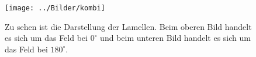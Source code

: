 \begin{figure}[htpb]
	\centering
	\texttt{[image: ../Bilder/kombi]}
	\caption{Zu sehen ist die Darstellung der Lamellen. Beim oberen Bild handelt es sich um das Feld bei $0^\circ$ und beim unteren Bild handelt es sich um das Feld bei $180^\circ$.}
	\label{fig:kombi}
\end{figure}
